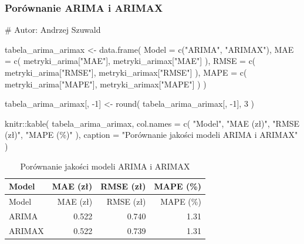 \documentclass[
  polish,
  letterpaper,
  DIV=11,
  numbers=noendperiod]{scrartcl}
\newenvironment{Shaded}{\begin{snugshade}}{\end{snugshade}}
\newcommand{\AttributeTok}[1]{\textcolor[rgb]{0.40,0.45,0.13}{#1}}
\newcommand{\CommentTok}[1]{\textcolor[rgb]{0.37,0.37,0.37}{#1}}
\newcommand{\DecValTok}[1]{\textcolor[rgb]{0.68,0.00,0.00}{#1}}
\newcommand{\FunctionTok}[1]{\textcolor[rgb]{0.28,0.35,0.67}{#1}}
\newcommand{\NormalTok}[1]{\textcolor[rgb]{0.00,0.23,0.31}{#1}}
\newcommand{\OtherTok}[1]{\textcolor[rgb]{0.00,0.23,0.31}{#1}}
\newcommand{\SpecialCharTok}[1]{\textcolor[rgb]{0.37,0.37,0.37}{#1}}
\newcommand{\StringTok}[1]{\textcolor[rgb]{0.13,0.47,0.30}{#1}}
\begin{document}
\subsubsection{Porównanie ARIMA i
ARIMAX}\label{poruxf3wnanie-arima-i-arimax}

\begin{Shaded}
\begin{Highlighting}[]
\CommentTok{\# Autor: Andrzej Szuwald}

\NormalTok{tabela\_arima\_arimax }\OtherTok{\textless{}{-}} \FunctionTok{data.frame}\NormalTok{(}
  \AttributeTok{Model =} \FunctionTok{c}\NormalTok{(}\StringTok{"ARIMA"}\NormalTok{, }\StringTok{"ARIMAX"}\NormalTok{),}
  \AttributeTok{MAE =} \FunctionTok{c}\NormalTok{(}
\NormalTok{    metryki\_arima[}\StringTok{"MAE"}\NormalTok{],}
\NormalTok{    metryki\_arimax[}\StringTok{"MAE"}\NormalTok{]}
\NormalTok{  ),}
  \AttributeTok{RMSE =} \FunctionTok{c}\NormalTok{(}
\NormalTok{    metryki\_arima[}\StringTok{"RMSE"}\NormalTok{],}
\NormalTok{    metryki\_arimax[}\StringTok{"RMSE"}\NormalTok{]}
\NormalTok{  ),}
  \AttributeTok{MAPE =} \FunctionTok{c}\NormalTok{(}
\NormalTok{    metryki\_arima[}\StringTok{"MAPE"}\NormalTok{],}
\NormalTok{    metryki\_arimax[}\StringTok{"MAPE"}\NormalTok{]}
\NormalTok{  )}
\NormalTok{)}

\NormalTok{tabela\_arima\_arimax[, }\SpecialCharTok{{-}}\DecValTok{1}\NormalTok{] }\OtherTok{\textless{}{-}} \FunctionTok{round}\NormalTok{(}
\NormalTok{  tabela\_arima\_arimax[, }\SpecialCharTok{{-}}\DecValTok{1}\NormalTok{],}
  \DecValTok{3}
\NormalTok{)}

\NormalTok{knitr}\SpecialCharTok{::}\FunctionTok{kable}\NormalTok{(}
\NormalTok{  tabela\_arima\_arimax,}
  \AttributeTok{col.names =} \FunctionTok{c}\NormalTok{(}
    \StringTok{"Model"}\NormalTok{,}
    \StringTok{"MAE (zł)"}\NormalTok{,}
    \StringTok{"RMSE (zł)"}\NormalTok{,}
    \StringTok{"MAPE (\%)"}
\NormalTok{  ),}
  \AttributeTok{caption =} \StringTok{"Porównanie jakości modeli ARIMA i ARIMAX"}
\NormalTok{)}
\end{Highlighting}
\end{Shaded}

\begin{longtable}[]{@{}lrrr@{}}
\caption{Porównanie jakości modeli ARIMA i ARIMAX}\tabularnewline
\toprule\noalign{}
Model & MAE (zł) & RMSE (zł) & MAPE (\%) \\
\midrule\noalign{}
\endfirsthead
\toprule\noalign{}
Model & MAE (zł) & RMSE (zł) & MAPE (\%) \\
\midrule\noalign{}
\endhead
\bottomrule\noalign{}
\endlastfoot
ARIMA & 0.522 & 0.740 & 1.31 \\
ARIMAX & 0.522 & 0.739 & 1.31 \\
\end{longtable}
\end{document}
